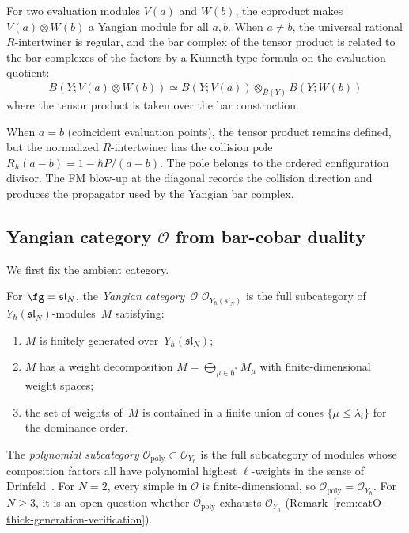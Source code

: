 \begin{remark}
\label{rem:tensor-eval}

For two evaluation modules $V(a)$ and $W(b)$, the coproduct makes
$V(a)\otimes W(b)$ a Yangian module for all $a,b$. When $a\neq b$, the
universal rational $R$-intertwiner is regular, and the bar complex of
the tensor product is related to the bar complexes of the factors by a
K\"unneth-type formula on the evaluation quotient:
\[
\bar{B}(Y; V(a) \otimes W(b)) \simeq
\bar{B}(Y; V(a)) \otimes_{\bar{B}(Y)} \bar{B}(Y; W(b))
\]
where the tensor product is taken over the bar construction.

When $a=b$ (coincident evaluation points), the tensor product remains
defined, but the normalized $R$-intertwiner has the collision pole
$R_\hbar(a-b)=1-\hbar P/(a-b)$. The pole belongs to the ordered
configuration divisor. The FM blow-up at the diagonal records the
collision direction and produces the propagator used by the Yangian
bar complex.
\end{remark}

\subsection{\texorpdfstring{Yangian category $\mathcal{O}$ from bar-cobar duality}{Yangian category O from bar-cobar duality}}
\label{sec:yangian-category-O}

We first fix the ambient category.

\begin{definition}
\label{def:yangian-category-O}
For $\fg = \mathfrak{sl}_N$, the \emph{Yangian category~$\mathcal{O}$}
$\mathcal{O}_{Y_\hbar(\mathfrak{sl}_N)}$ is the full subcategory of
$Y_\hbar(\mathfrak{sl}_N)$-modules~$M$ satisfying:
\begin{enumerate}[label=\textup{(\roman*)}]
\item $M$ is finitely generated over~$Y_\hbar(\mathfrak{sl}_N)$;
\item $M$ has a weight decomposition
 $M = \bigoplus_{\mu \in \mathfrak{h}^*} M_\mu$ with
 finite-dimensional weight spaces;
\item the set of weights of~$M$ is contained in a finite union
 of cones $\{\mu \leq \lambda_i\}$ for the dominance order.
\end{enumerate}
The \emph{polynomial subcategory}
$\mathcal{O}_{\mathrm{poly}} \subset \mathcal{O}_{Y_\hbar}$ is the
full subcategory of modules whose composition factors all have
polynomial highest $\ell$-weights in the sense of
Drinfeld~\cite{Drinfeld88}. For $N = 2$, every simple in
$\mathcal{O}$ is finite-dimensional, so
$\mathcal{O}_{\mathrm{poly}} = \mathcal{O}_{Y_\hbar}$. For
$N \ge 3$, it is an open question whether
$\mathcal{O}_{\mathrm{poly}}$ exhausts $\mathcal{O}_{Y_\hbar}$
\textup{(}Remark~\textup{\ref{rem:catO-thick-generation-verification}}\textup{)}.
\end{definition}

